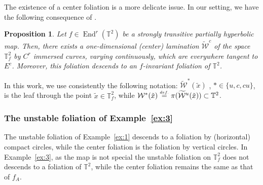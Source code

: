 \documentclass[a4paper,11pt,reqno]{amsart}
\newcommand{\TT}{{\mathbb{T}^2}}
\newcommand{\TTf}{{\mathbb{T}_f^2}}
\newcommand{\cW}{{\mathcal W}}
\newcommand{\eqdef}{\stackrel{\scriptscriptstyle\textrm def.}{=}}
\newcommand{\tix}{\tilde{x}}
\newcommand{\w}{\widetilde{\cW}}
\newtheorem{proposition}{Proposition}
\theoremstyle{definition}
\begin{document}
The existence of a center foliation is a more delicate issue. In our setting, we have the following consequence of \cite[Theorem B]{HallHammerlindl22}.

\begin{proposition}
    \label{prop:notannulus}
Let $f\in\operatorname{End}^r(\TT)$ be a strongly transitive partially hyperbolic map. Then, there exists a one-dimensional (center) lamination $\w^c$ of the space $\TTf$ by $C^r$ immersed curves, varying continuously, which are everywhere tangent to $E^c$. Moreover, this foliation descends to an $f$-invariant foliation of $\TT$.
\end{proposition}

In this work, we use consistently the following notation: $\w^{*}(\tix)$ , $* \in \{u, c, cu \}$, is the leaf through the point $\tix\in\TTf$, while $\cW^{*}(\tix)\eqdef\pi(\w^u(\tix))\subset\TT$.

\subsubsection{The unstable foliation of Example~\ref{ex:3}}
\label{subsec:provasexe3}
The unstable foliation of Example~\ref{ex:1} descends to a foliation by (horizontal) compact circles, while the center foliation is the foliation by vertical circles. In Example~\ref{ex:3}, as the map is not special the unstable foliation on $\TTf$ does not descends to a foliation of $\TT$, while the center foliation remains the same as that of $f_A$.
\end{document}
